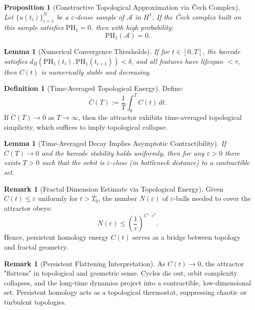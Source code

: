 \documentclass[11pt]{article}
\newtheorem{lemma}[theorem]{Lemma}
\newtheorem{proposition}[theorem]{Proposition}
\theoremstyle{definition}
\newtheorem{definition}[theorem]{Definition}
\newtheorem{remark}[theorem]{Remark}
\begin{document}
\begin{proposition}[Constructive Topological Approximation via Čech Complex]
Let $\{u(t_i)\}_{i=1}^N$ be a $\varepsilon$-dense sample of $\mathcal{A}$ in $H^1$. If the Čech complex built on this sample satisfies $\mathrm{PH}_1 = 0$, then with high probability:
\[
\mathrm{PH}_1(\mathcal{A}) = 0.
\]
\end{proposition}

\begin{lemma}[Numerical Convergence Thresholds]
If for $t \in [0, T]$, the barcode satisfies $d_B(\mathrm{PH}_1(t_{i}), \mathrm{PH}_1(t_{i+1})) < \delta$, and all features have lifespan $< \tau$, then $C(t)$ is numerically stable and decreasing.
\end{lemma}

\begin{definition}[Time-Averaged Topological Energy]
Define:
\[
\overline{C}(T) := \frac{1}{T} \int_0^T C(t)\,dt.
\]
If $\overline{C}(T) \to 0$ as $T \to \infty$, then the attractor exhibits time-averaged topological simplicity, which suffices to imply topological collapse.
\end{definition}

\begin{lemma}[Time-Averaged Decay Implies Asymptotic Contractibility]
If $\overline{C}(T) \to 0$ and the barcode stability holds uniformly, then for any $\varepsilon > 0$ there exists $T > 0$ such that the orbit is $\varepsilon$-close (in bottleneck distance) to a contractible set.
\end{lemma}

\begin{remark}[Fractal Dimension Estimate via Topological Energy]
Given $C(t) \le \varepsilon$ uniformly for $t > T_0$, the number $N(\varepsilon)$ of $\varepsilon$-balls needed to cover the attractor obeys:
\[
N(\varepsilon) \le \left(\frac{1}{\varepsilon}\right)^{C' \cdot \varepsilon^\delta}.
\]
Hence, persistent homology energy $C(t)$ serves as a bridge between topology and fractal geometry.
\end{remark}

\begin{remark}[Persistent Flattening Interpretation]
As $C(t) \to 0$, the attractor "flattens" in topological and geometric sense. Cycles die out, orbit complexity collapses, and the long-time dynamics project into a contractible, low-dimensional set. Persistent homology acts as a topological thermostat, suppressing chaotic or turbulent topologies.
\end{remark}
\end{document}
